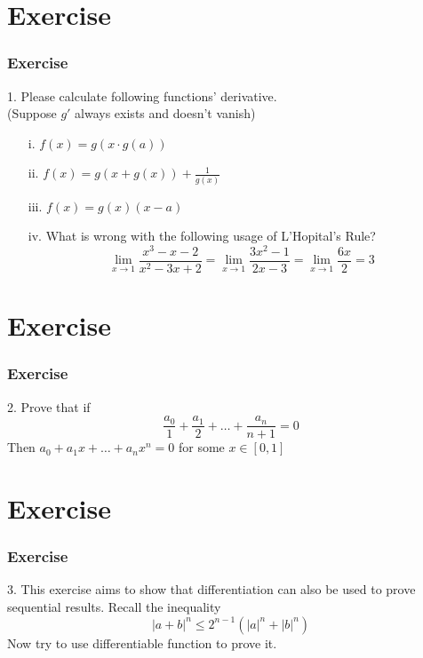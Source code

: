 \documentclass[12pt, t]{beamer}
\begin{document}
\section{Exercise}
\begin{frame}
    \frametitle{Exercise}
    1. Please calculate following functions' derivative.\\(Suppose $g'$ always exists and doesn't vanish)
    \begin{enumerate}
        \item[i.]   $f(x)=g(x\cdot g(a))$
        \item[ii.]  $f(x)=g(x+g(x))+\frac{1}{g(x)}$
        \item[iii.] $f(x) =g(x)(x-a)$
        \item[iv.]  What is wrong with the following usage of L'Hopital's Rule?\\
            \begin{equation*}
                \underset{x\rightarrow 1}{\lim}\frac{x^3-x-2}{x^2-3x+2}=\underset{x\rightarrow 1}{\lim}\frac{3x^2-1}{2x-3}=\underset{x\rightarrow 1}{\lim}\frac{6x}{2}=3
            \end{equation*}
    \end{enumerate}

\end{frame}

\section{Exercise}
\begin{frame}
    \frametitle{Exercise}
    2. Prove that if
    \begin{equation*}
        \frac{a_0}{1}+\frac{a_1}{2}+\dots+\frac{a_n}{n+1}=0
    \end{equation*}
    Then $a_0+a_1x+\dots+a_nx^n=0$ for some $x\in[0,1]$
\end{frame}

\section{Exercise}
\begin{frame}
    \frametitle{Exercise}
    3. This exercise aims to show that differentiation can also be used to prove sequential results. Recall
    the inequality
    \begin{equation*}
        |a+b|^n\leq 2^{n-1}(|a|^n+|b|^n)
    \end{equation*}
    Now try to use differentiable function to prove it.
\end{frame}
\end{document}
